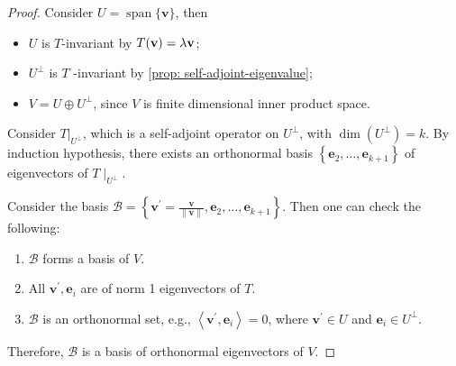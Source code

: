 \begin{proof}
Consider \(U = \operatorname{span}\{ \mathbf{v}\}\), then
\begin{itemize}
\item \(U\) is \(T\)-invariant by \(T({\bf v}) = \lambda {\bf v}\);
\item \({U}^{ \bot  }\) is \(T\) -invariant by \autoref{prop: self-adjoint-eigenvalue};
\item \(V = U \oplus  {U}^{ \bot  }\), since \(V\) is finite dimensional inner product space.
\end{itemize}

Consider \({\left. T\right| }_{{U}^{ \bot  }}\), which is a self-adjoint operator on \({U}^{ \bot  }\), with \(\dim \left( {U}^{ \bot  }\right)  = k\). By induction hypothesis, there exists an orthonormal basis \(\left\{  {{\mathbf{e}}_{2},\ldots,{\mathbf{e}}_{k + 1}}\right\}\) of eigenvectors of \(T{ \mid  }_{{U}^{ \bot  }}\).

Consider the basis \(\mathcal{B} = \left\{  {{\mathbf{v}}^{\prime } = \frac{\mathbf{v}}{\parallel \mathbf{v}\parallel},{\mathbf{e}}_{2},\ldots,{\mathbf{e}}_{k + 1}}\right\}\). Then one can check the following:
\begin{enumerate}
    \item \(\mathcal{B}\) forms a basis of \(V\).
    \item All \({\mathbf{v}}^{\prime },{\mathbf{e}}_{i}\) are of norm 1 eigenvectors of \(T\).
    \item \(\mathcal{B}\) is an orthonormal set, e.g., \(\left\langle  {{\mathbf{v}}^{\prime },{\mathbf{e}}_{i}}\right\rangle   = 0\), where \({\mathbf{v}}^{\prime } \in  U\) and \({\mathbf{e}}_{i} \in  {U}^{ \bot  }\).
\end{enumerate}
Therefore, \(\mathcal{B}\) is a basis of orthonormal eigenvectors of \(V\).
\end{proof}

